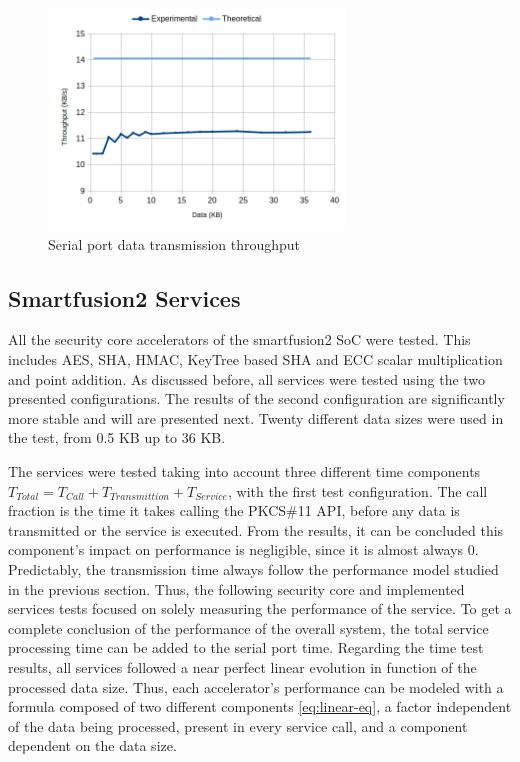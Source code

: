 \begin{figure}[h!]
	\centering
	\includegraphics[width=0.7\textwidth]{./Images/comms-tput.png}
	\caption{Serial port data transmission throughput}
	\label{fig:comms:tput}
\end{figure}

\subsection{Smartfusion2 Services}\label{chap:evaluation:board}

All the security core accelerators of the smartfusion2 SoC were tested. This includes \ac{AES}, \ac{SHA}, \ac{HMAC}, KeyTree based \ac{SHA} and \ac{ECC} scalar multiplication and point addition.
As discussed before, all services were tested using the two presented configurations. The results of the second configuration are significantly more stable and will are presented next.
Twenty different data sizes were used in the test, from 0.5 KB up to 36 KB.

The services were tested taking into account three different time components \(T_{Total} = T_{Call} + T_{Transmittion} + T_{Service}\), with the first test configuration. The call fraction is the time it takes calling the PKCS\#11 API, before any data is transmitted or the service is executed. From the results, it can be concluded this component's impact on performance is negligible, since it is almost always 0.
Predictably, the transmission time always follow the performance model studied in the previous section.
Thus, the following security core and implemented services tests focused on solely measuring the performance of the service. To get a complete conclusion of the performance of the overall system, the total service processing time can be added to the serial port time.
Regarding the time test results, all services followed a near perfect linear evolution in function of the processed data size. Thus, each accelerator's performance can be modeled with a formula composed of two different components \ref{eq:linear-eq}, a factor independent of the data being processed, present in every service call, and a component dependent on the data size.

